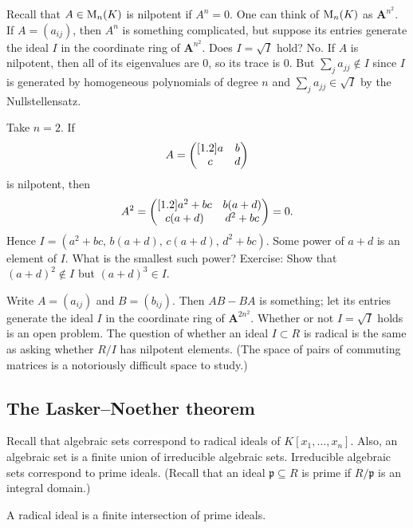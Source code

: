 \documentclass[11pt, oneside,margin=1in]{article}
\begin{document}
\begin{example}\label{}\text{}
Recall that $A\in \operatorname{M}_n(K)$ is nilpotent if $A^n = 0$. One can think of $\operatorname{M}_n(K)$ as $\mathbf{A}^{n^2}$. If $A = (a_{ij})$, then $A^n$ is something complicated, but suppose its entries generate the ideal $I$ in the coordinate ring of $\mathbf{A}^{n^2}$. Does $I=\sqrt{I} $ hold? No. If $A$ is nilpotent, then all of its eigenvalues are $0$, so its trace is $0$. But $\sum_{j}^{} a_{jj}\notin I$ since $I$ is generated by homogeneous polynomials of degree $n$ and $\sum_{j}^{} a_{jj} \in \sqrt{I} $ by the Nullstellensatz.

Take $n=2$. If 
\begin{align*}
	A = \begin{pmatrix} [ 1.2 ] a&b\\c&d\end{pmatrix}
\end{align*}
is nilpotent, then
\begin{align*}
	A^2 = \begin{pmatrix} [ 1.2 ] a^2 + bc&b(a+d)\\c (a+d) &d^2 + bc\end{pmatrix} = 0.
\end{align*}
Hence $I=   (a^2+bc,\, b(a+d), \,c (a+d),\,d^2 + bc)$. Some power of $a+d$ is an element of $I$. What is the smallest such power? Exercise: Show that $(a+d)^2\notin I$ but $(a+d)^3\in I$.
\end{example}

\begin{example}\label{}\text{}
Write $A=(a_{ij})$ and $B=(b_{ij})$. Then $AB-BA$ is something; let its entries generate the ideal $I$ in the coordinate ring of $\mathbf{A}^{2n^2}$. Whether or not $I=\sqrt{I} $ holds is an open problem. The question of whether an ideal $I\subset R$ is radical is the same as asking whether $R/I$ has nilpotent elements. (The space of pairs of commuting matrices is a notoriously difficult space to study.)
\end{example}


\subsection{The Lasker--Noether theorem}
Recall that algebraic sets correspond to radical ideals of $K[x_1,\hdots, x_n]$. Also, an algebraic set is a finite union of irreducible algebraic sets. Irreducible algebraic sets correspond to prime ideals. (Recall that an ideal $\mathfrak{p}\subseteq R$ is prime if $R/\mathfrak{p}$ is an integral domain.)

\begin{theorem}[ ]\label{}\index{}\text{}
A radical ideal is a finite intersection of prime ideals.
\end{theorem}
\end{document}
